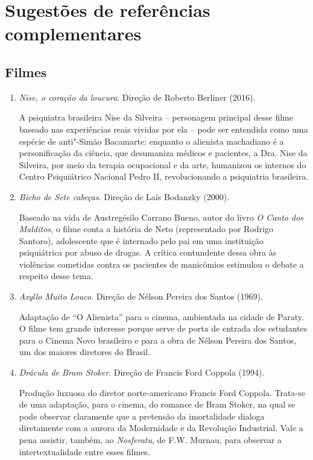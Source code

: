 \documentclass{extarticle}
\begin{document}
\section{Sugestões de referências complementares}\label{sugestoes}

\subsection{Filmes}

\begin{enumerate}
\item\textit{Nise, o coração da loucura}. Direção de Roberto Berliner (2016).

A psiquiatra brasileira Nise da Silveira -- personagem principal desse
filme baseado nas experiências reais vividas por ela -- pode ser
entendida como uma espécie de anti"-Simão Bacamarte: enquanto o alienista
machadiano é a personificação da ciência, que desumaniza médicos e
pacientes, a Dra. Nise da Silveira, por meio da terapia ocupacional e da
arte, humanizou os internos do Centro Psiquiátrico Nacional Pedro II,
revolucionando a psiquiatria brasileira.

\item\textit{Bicho de Sete cabeças}. Direção de Laís Bodanzky (2000).

Baseado na vida de Austregésilo Carrano Bueno, autor do livro \emph{O
Canto dos Malditos}, o filme conta a história de Neto (representado por
Rodrigo Santoro), adolescente que é internado pelo pai em uma
instituição psiquiátrica por abuso de drogas. A crítica contundente
dessa obra às violências cometidas contra os pacientes de manicômios
estimulou o debate a respeito desse tema.

\item\textit{Azyllo Muito Louco}. Direção de Nélson Pereira dos Santos (1969).

Adaptação de ``O Alienista'' para o cinema, ambientada na cidade de
Paraty. O filme tem grande interesse porque serve de porta de entrada
dos estudantes para o Cinema Novo brasileiro e para a obra de Nélson
Pereira dos Santos, um dos maiores diretores do Brasil.

\item\textit{Drácula de Bram Stoker}. Direção de Francis Ford Coppola (1994).

Produção luxuosa do diretor norte-americano Francis Ford Coppola.
Trata-se de uma adaptação, para o cinema, do romance de Bram Stoker, na
qual se pode observar claramente que a pretensão da imortalidade dialoga
diretamente com a aurora da Modernidade e da Revolução Industrial. Vale
a pena assistir, também, ao \emph{Nosferatu}, de F.W. Murnau, para
observar a intertextualidade entre esses filmes.


\end{enumerate}
\end{document}
